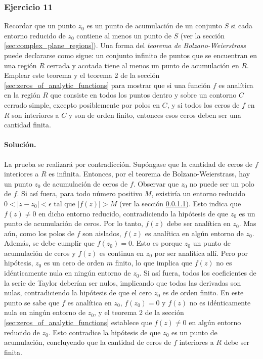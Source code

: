 \documentclass[a4paper]{report}
\begin{document}
\subsubsection{Ejercicio 11} 

Recordar que un punto \(z_0\) es un punto de acumulación de un conjunto \(S\) si cada entorno reducido de \(z_0\) contiene al menos un punto de \(S\) (ver la sección \ref{sec:complex_plane_regions}). Una forma del \emph{teorema de Bolzano-Weierstrass} puede declararse como sigue: un conjunto infinito de puntos que se encuentran en una región \(R\) cerrada y acotada tiene al menos un punto de acumulación en \(R\). Emplear este teorema y el teorema 2 de la sección \ref{sec:zeros_of_analytic_functions} para mostrar que si una función \(f\) es analítica en la región \(R\) que consiste en todos los puntos dentro y sobre un contorno \(C\) cerrado simple, excepto posiblemente por polos en \(C\), y si todos los ceros de \(f\) en \(R\) son interiores a \(C\) y son de orden finito, entonces esos ceros deben ser una cantidad finita. 

\paragraph{Solución.} La prueba se realizará por contradicción. Supóngase que la cantidad de ceros de \(f\) interiores a \(R\) es infinita. Entonces, por el teorema de Bolzano-Weierstrass, hay un punto \(z_0\) de acumulación de ceros de \(f\). Observar que \(z_0\) no puede ser un polo de \(f\). Si así fuera, para todo número positivo \(M\), existiría un entorno reducido \(0<|z-z_0|<\epsilon\) tal que \(|f(z)|>M\) (ver la sección \ref{}). Esto indica que \(f(z)\neq0\) en dicho entorno reducido, contradiciendo la hipótesis de que \(z_0\) es un punto de acumulación de ceros. Por lo tanto, \(f(z)\) debe ser analítica en \(z_0\). Mas aún, como los polos de \(f\) son aislados, \(f(z)\) es analítica en algún entorno de \(z_0\). Además, se debe cumplir que \(f(z_0)=0\). Esto es porque \(z_0\) un punto de acumulación de ceros y \(f(z)\) es continua en \(z_0\) por ser analítica allí. Pero por hipótesis, \(z_0\) es un cero de orden \(m\) finito, lo que implica que \(f(z)\) no es idénticamente nula en ningún entorno de \(z_0\). Si así fuera, todos los coeficientes de la serie de Taylor deberían ser nulos, implicando que todas las derivadas son nulas, contradiciendo la hipótesis de que el cero \(z_0\) es de orden finito. En este punto se sabe que \(f\) es analítica en \(z_0\), \(f(z_0)=0\) y \(f(z)\) no es idénticamente nula en ningún entorno de \(z_0\), y el teorema 2 de la sección \ref{sec:zeros_of_analytic_functions} establece que \(f(z)\neq0\) en algún entorno reducido de \(z_0\). Esto contradice la hipótesis de que \(z_0\) es un punto de acumulación, concluyendo que la cantidad de ceros de \(f\) interiores a \(R\) debe ser finita.
\end{document}

